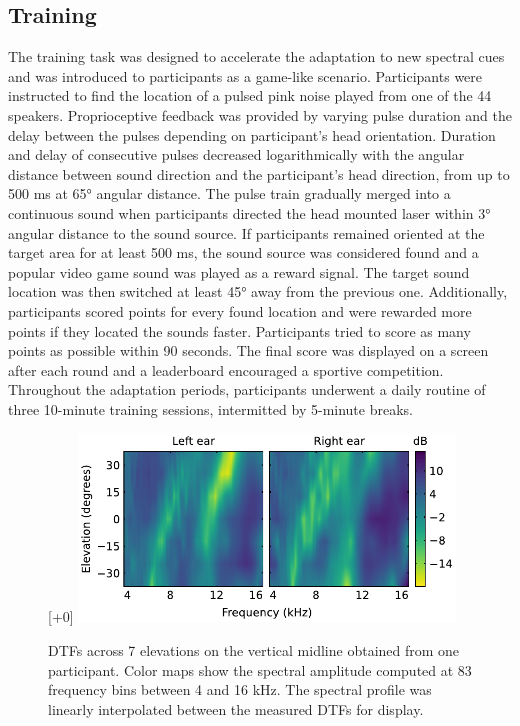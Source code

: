 \subsection{Training}
The training task was designed to accelerate the adaptation to new spectral cues and was introduced to participants as a game-like scenario. Participants were instructed to find the location of a pulsed pink noise played from one of the 44 speakers. Proprioceptive feedback was provided by varying pulse duration and the delay between the pulses depending on participant’s head orientation. Duration and delay of consecutive pulses decreased logarithmically with the angular distance between sound direction and the participant’s head direction, from up to 500 ms at 65° angular distance. The pulse train gradually merged into a continuous sound when participants directed the head mounted laser within 3° angular distance to the sound source. If participants remained oriented at the target area for at least 500 ms, the sound source was considered found and a popular video game sound was played as a reward signal. The target sound location was then switched at least 45° away from the previous one. Additionally, participants scored points for every found location and were rewarded more points if they located the sounds faster. Participants tried to score as many points as possible within 90 seconds. The final score was displayed on a screen after each round and a leaderboard encouraged a sportive competition. Throughout the adaptation periods, participants underwent a daily routine of three 10-minute training sessions, intermitted by 5-minute breaks.

\begin{figure}
\centering
\raisebox{0pt}[\dimexpr\height+0\baselineskip\relax]{
\includegraphics[width=10cm]{../Results/figures/fig1/fig1}}
\caption{DTFs across 7 elevations on the vertical midline obtained from one participant. Color maps show the spectral amplitude computed at 83 frequency bins between 4 and 16 kHz. The spectral profile was linearly interpolated between the measured DTFs for display.}
\label{fig:ef_l_r}
\end{figure}
\noindent\vspace{-\baselineskip}

